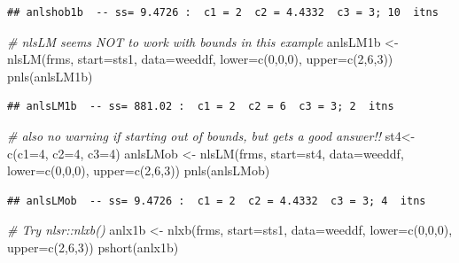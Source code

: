 \documentclass[
]{article}
\newenvironment{Shaded}{\begin{snugshade}}{\end{snugshade}}
\newcommand{\AttributeTok}[1]{\textcolor[rgb]{0.77,0.63,0.00}{#1}}
\newcommand{\CommentTok}[1]{\textcolor[rgb]{0.56,0.35,0.01}{\textit{#1}}}
\newcommand{\DecValTok}[1]{\textcolor[rgb]{0.00,0.00,0.81}{#1}}
\newcommand{\FunctionTok}[1]{\textcolor[rgb]{0.00,0.00,0.00}{#1}}
\newcommand{\NormalTok}[1]{#1}
\newcommand{\OtherTok}[1]{\textcolor[rgb]{0.56,0.35,0.01}{#1}}
\begin{document}
\begin{verbatim}
## anlshob1b  -- ss= 9.4726 :  c1 = 2  c2 = 4.4332  c3 = 3; 10  itns
\end{verbatim}

\begin{Shaded}
\begin{Highlighting}[]
\CommentTok{\# nlsLM seems NOT to work with bounds in this example}
\NormalTok{anlsLM1b }\OtherTok{\textless{}{-}} \FunctionTok{nlsLM}\NormalTok{(frms, }\AttributeTok{start=}\NormalTok{sts1, }\AttributeTok{data=}\NormalTok{weeddf, }\AttributeTok{lower=}\FunctionTok{c}\NormalTok{(}\DecValTok{0}\NormalTok{,}\DecValTok{0}\NormalTok{,}\DecValTok{0}\NormalTok{), }\AttributeTok{upper=}\FunctionTok{c}\NormalTok{(}\DecValTok{2}\NormalTok{,}\DecValTok{6}\NormalTok{,}\DecValTok{3}\NormalTok{))}
\FunctionTok{pnls}\NormalTok{(anlsLM1b)}
\end{Highlighting}
\end{Shaded}

\begin{verbatim}
## anlsLM1b  -- ss= 881.02 :  c1 = 2  c2 = 6  c3 = 3; 2  itns
\end{verbatim}

\begin{Shaded}
\begin{Highlighting}[]
\CommentTok{\# also no warning if starting out of bounds, but gets a good answer!!}
\NormalTok{st4}\OtherTok{\textless{}{-}}\FunctionTok{c}\NormalTok{(}\AttributeTok{c1=}\DecValTok{4}\NormalTok{, }\AttributeTok{c2=}\DecValTok{4}\NormalTok{, }\AttributeTok{c3=}\DecValTok{4}\NormalTok{)}
\NormalTok{anlsLMob }\OtherTok{\textless{}{-}} \FunctionTok{nlsLM}\NormalTok{(frms, }\AttributeTok{start=}\NormalTok{st4, }\AttributeTok{data=}\NormalTok{weeddf, }\AttributeTok{lower=}\FunctionTok{c}\NormalTok{(}\DecValTok{0}\NormalTok{,}\DecValTok{0}\NormalTok{,}\DecValTok{0}\NormalTok{), }\AttributeTok{upper=}\FunctionTok{c}\NormalTok{(}\DecValTok{2}\NormalTok{,}\DecValTok{6}\NormalTok{,}\DecValTok{3}\NormalTok{))}
\FunctionTok{pnls}\NormalTok{(anlsLMob)}
\end{Highlighting}
\end{Shaded}

\begin{verbatim}
## anlsLMob  -- ss= 9.4726 :  c1 = 2  c2 = 4.4332  c3 = 3; 4  itns
\end{verbatim}

\begin{Shaded}
\begin{Highlighting}[]
\CommentTok{\# Try nlsr::nlxb()}
\NormalTok{anlx1b }\OtherTok{\textless{}{-}} \FunctionTok{nlxb}\NormalTok{(frms, }\AttributeTok{start=}\NormalTok{sts1, }\AttributeTok{data=}\NormalTok{weeddf, }\AttributeTok{lower=}\FunctionTok{c}\NormalTok{(}\DecValTok{0}\NormalTok{,}\DecValTok{0}\NormalTok{,}\DecValTok{0}\NormalTok{), }\AttributeTok{upper=}\FunctionTok{c}\NormalTok{(}\DecValTok{2}\NormalTok{,}\DecValTok{6}\NormalTok{,}\DecValTok{3}\NormalTok{))}
\FunctionTok{pshort}\NormalTok{(anlx1b)}
\end{Highlighting}
\end{Shaded}
\end{document}
